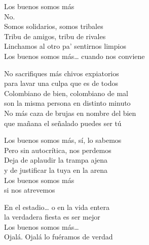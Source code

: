 \begin{lyrics}
Los buenos somos más\\
No.\\
Somos solidarios, somos tribales\\
Tribu de amigos, tribu de rivales\\
Linchamos al otro pa' sentirnos limpios\\
Los buenos somos más… cuando nos conviene

No sacrifiques más chivos expiatorios\\
para lavar una culpa que es de todos\\
Colombiano de bien, colombiano de mal\\
son la misma persona en distinto minuto\\
No más caza de brujas en nombre del bien\\
que mañana el señalado puedes ser tú

Los buenos somos más, sí, lo sabemos\\
Pero sin autocrítica, nos perdemos\\
Deja de aplaudir la trampa ajena\\
y de justificar la tuya en la arena\\
Los buenos somos más\\
si nos atrevemos

En el estadio… o en la vida entera\\
la verdadera fiesta es ser mejor\\
Los buenos somos más…\\
Ojalá. Ojalá lo fuéramos de verdad
\end{lyrics}

